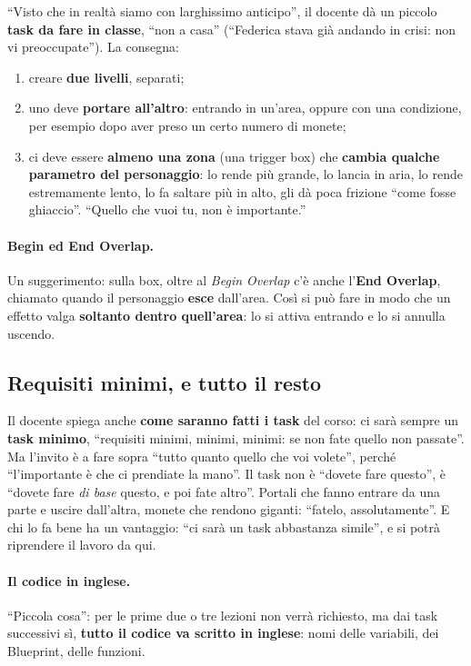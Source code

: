 ``Visto che in realtà siamo con larghissimo anticipo'', il docente dà un
piccolo \textbf{task da fare in classe}, ``non a casa'' (``Federica stava già
andando in crisi: non vi preoccupate''). La consegna:
\begin{enumerate}
  \item creare \textbf{due livelli}, separati;
  \item uno deve \textbf{portare all'altro}: entrando in un'area, oppure con
        una condizione, per esempio dopo aver preso un certo numero di
        monete;
  \item ci deve essere \textbf{almeno una zona} (una trigger box) che
        \textbf{cambia qualche parametro del personaggio}: lo rende più
        grande, lo lancia in aria, lo rende estremamente lento, lo fa saltare
        più in alto, gli dà poca frizione ``come fosse ghiaccio''. ``Quello
        che vuoi tu, non è importante.''
\end{enumerate}

\paragraph{Begin ed End Overlap.} Un suggerimento: sulla box, oltre al
\emph{Begin Overlap} c'è anche l'\textbf{End Overlap}, chiamato quando il
personaggio \textbf{esce} dall'area. Così si può fare in modo che un effetto
valga \textbf{soltanto dentro quell'area}: lo si attiva entrando e lo si
annulla uscendo.

\subsection{Requisiti minimi, e tutto il resto}

Il docente spiega anche \textbf{come saranno fatti i task} del corso: ci sarà
sempre un \textbf{task minimo}, ``requisiti minimi, minimi, minimi: se non
fate quello non passate''. Ma l'invito è a fare sopra ``tutto quanto quello
che voi volete'', perché ``l'importante è che ci prendiate la mano''. Il task
non è ``dovete fare questo'', è ``dovete fare \emph{di base} questo, e poi
fate altro''. Portali che fanno entrare da una parte e uscire dall'altra,
monete che rendono giganti: ``fatelo, assolutamente''. E chi lo fa bene ha un
vantaggio: ``ci sarà un task abbastanza simile'', e si potrà riprendere il
lavoro da qui.

\paragraph{Il codice in inglese.} ``Piccola cosa'': per le prime due o tre
lezioni non verrà richiesto, ma dai task successivi sì, \textbf{tutto il
codice va scritto in inglese}: nomi delle variabili, dei Blueprint, delle
funzioni.

